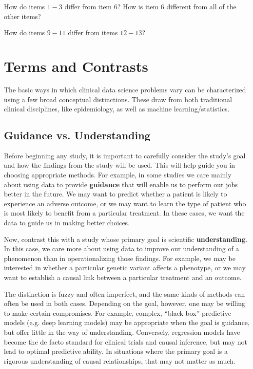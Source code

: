 \begin{question}{}
How do items $1-3$ differ from item $6$? How is item $6$ different from all of the other items? 
\end{question}

\begin{question}{}
How do items $9-11$ differ from items $12-13$? 
\end{question}


\section{Terms and Contrasts}

The basic ways in which clinical data science problems vary can be characterized using a few broad conceptual distinctions. These draw from both traditional clinical disciplines, like epidemiology, as well as machine learning/statistics.

\subsection{Guidance vs. Understanding}

Before beginning any study, it is important to carefully consider the study's goal and how the findings from the study will be used. This will help guide you in choosing appropriate methods. For example, in some studies we care mainly about using data to provide \textbf{guidance} that will enable us to perform our jobs better in the future. We may want to predict whether a patient is likely to experience an adverse outcome, or we may want to learn the type of patient who is most likely to benefit from a particular treatment. In these cases, we want the data to guide us in making better choices.

Now, contrast this with a study whose primary goal is scientific \textbf{understanding}. In this case, we care more about using data to improve our understanding of a phenomenon than in operationalizing those findings. For example, we may be interested in whether a particular genetic variant affects a phenotype, or we may want to establish a causal link between a particular treatment and an outcome. 

The distinction is fuzzy and often imperfect, and the same kinds of methods can often be used in both cases. Depending on the goal, however, one may be willing to make certain compromises. For example, complex, ``black box'' predictive models (e.g. deep learning models) may be appropriate when the goal is guidance, but offer little in the way of understanding. Conversely, regression models have become the de facto standard for clinical trials and causal inference, but may not lead to optimal predictive ability. In situations where the primary goal is a rigorous understanding of causal relationships, that may not matter as much.

